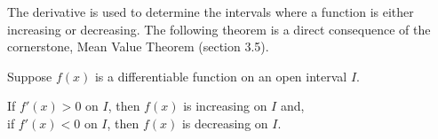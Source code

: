 \documentclass[handout]{ximera}
\begin{document}










The derivative is used to determine the intervals where a function is either 
increasing or decreasing.
The following theorem is a direct consequence of the cornerstone, Mean Value Theorem (section 3.5).


\begin{theorem}
Suppose $f(x)$ is a differentiable function on an open interval $I$.

 If $f'(x) > 0$ on $I$, 
then $f(x)$ is increasing on $I$ and,\\
 if $f'(x) < 0$ on $I$, then $f(x)$ is 
decreasing on $I$.
\end{theorem}
\end{document}
